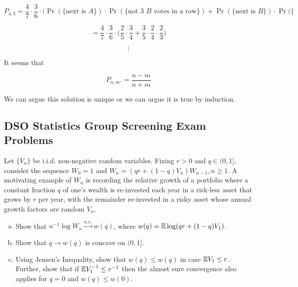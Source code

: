 \begin{solution}
\[
P_{4,3} = \frac{4}{7} \cdot \frac{3}{6} \cdot \bigg( \Pr(\{\text{next is } A\}) \cdot \Pr(\{\text{not 3 } B \text{ votes in a row}\})+ \Pr(\{\text{next is } B\}) \cdot \Pr( \{ 
\]

\[
= \frac{4}{7} \cdot \frac{3}{6} \cdot \bigg(\frac{2}{5} \cdot \frac{3}{4} + \frac{3}{5} \cdot \frac{2}{4} \cdot \frac{2}{3} \bigg) 
\]

\[
\vdots
\]

It seems that

\[
\boxed{
P_{n,m}.= \frac{n-m}{n+m}}
\]

We can argue this solution is unique or we can argue it is true by induction. 

\end{solution}

\subsection{DSO Statistics Group Screening Exam Problems}

\begin{exercise}

Let \(\{V_n\}\) be i.i.d. non-negative random variables. Fixing \(r > 0\) and \(q \in (0,1]\), consider the sequence \(W_0 = 1\) and \(W_n = (qr + (1-q)V_n)W_{n-1}, n \geq 1\). A motivating example of \(W_n\) is recording the relative growth of a portfolio where a constant fraction \(q\) of one's wealth is re-invested each year in a risk-less asset that grows by \(r\) per year, with the remainder re-invested in a risky asset whose annual growth factors are random \(V_n\).

\begin{enumerate}[(a)]

\item Show that \(n^{-1} \log W_n \xrightarrow{a.s.} w(q)\), where \(w(q) = \E \log (qr + (1-q)V_1)\).

\item Show that \(q \to w(q)\) is concave on \((0,1]\).

\item Using Jensen's Inequality, show that \(w(q) \leq w(q)\) in case \(\E V_1 \leq r\). Further, show that if \(\E V_1^{-1} \leq r^{-1}\) then the almost sure convergence also applies for \(q=0\) and \(w(q) \leq w(0)\).

\end{enumerate}

\end{exercise}

